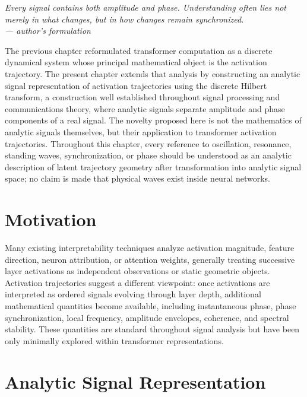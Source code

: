 \documentclass[11pt,twoside,openright]{book}
\numberwithin{equation}{chapter}
\theoremstyle{definition}
\theoremstyle{plain}
\theoremstyle{remark}
\theoremstyle{definition}
\begin{document}
\vspace{1em}
\begin{flushright}\itshape
Every signal contains both amplitude and phase. Understanding often lies
not merely in what changes, but in how changes remain synchronized.\\
\upshape --- author's formulation
\end{flushright}
\vspace{1em}

The previous chapter reformulated transformer computation as a discrete
dynamical system whose principal mathematical object is the activation
trajectory. The present chapter extends that analysis by constructing an
analytic signal representation of activation trajectories using the
discrete Hilbert transform, a construction well established throughout
signal processing and communications theory, where analytic signals
separate amplitude and phase components of a real signal. The novelty
proposed here is not the mathematics of analytic signals themselves, but
their application to transformer activation trajectories. Throughout this
chapter, every reference to oscillation, resonance, standing waves,
synchronization, or phase should be understood as an analytic description
of latent trajectory geometry after transformation into analytic signal
space; no claim is made that physical waves exist inside neural networks.

\section{Motivation}

Many existing interpretability techniques analyze activation magnitude,
feature direction, neuron attribution, or attention weights, generally
treating successive layer activations as independent observations or
static geometric objects. Activation trajectories suggest a different
viewpoint: once activations are interpreted as ordered signals evolving
through layer depth, additional mathematical quantities become
available, including instantaneous phase, phase synchronization, local
frequency, amplitude envelopes, coherence, and spectral stability. These
quantities are standard throughout signal analysis but have been only
minimally explored within transformer representations.

\section{Analytic Signal Representation}
\end{document}
